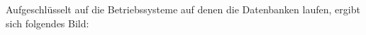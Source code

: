 Aufgeschlüsselt auf die Betriebssysteme auf denen die Datenbanken laufen, ergibt sich folgendes Bild:
